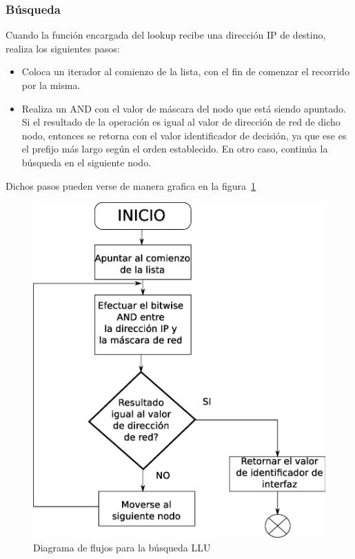 \subsubsection{Búsqueda}

Cuando la función encargada del lookup recibe una dirección IP de destino, realiza los siguientes pasos:

\begin{itemize}
	\item Coloca un iterador al comienzo de la lista, con el fin de comenzar el recorrido por la misma.
	\item Realiza un AND con el valor de máscara del nodo que está siendo apuntado. Si el resultado de la operación es igual al valor de dirección de red de dicho nodo, entonces se retorna con el valor identificador de decisión, ya que ese es el prefijo más largo según el orden establecido. En otro caso, continúa la búsqueda en el siguiente nodo.
\end{itemize}

Dichos pasos pueden verse de manera grafica en la figura~\ref{fig:llusearch}

\begin{figure}[H]
  \centering
	\includegraphics[scale=0.50]{4-implementacion/graf/llusearch.eps}
  \caption{Diagrama de flujos para la búsqueda LLU}
  \label{fig:llusearch}
\end{figure}

